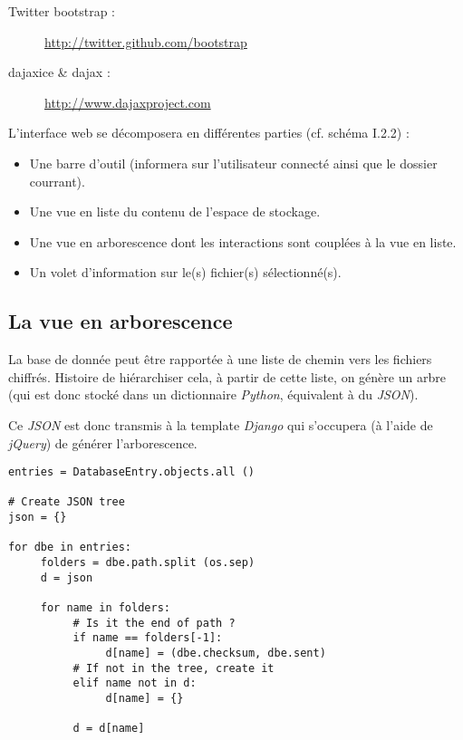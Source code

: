 \begin{description}
     \item[Twitter bootstrap :] \url{http://twitter.github.com/bootstrap}
     \item[dajaxice \& dajax :] \url{http://www.dajaxproject.com}
\end{description}


L'interface web se décomposera en différentes parties (cf. schéma I.2.2) :

\begin{itemize}
     \item Une barre d'outil (informera sur l'utilisateur connecté ainsi que le dossier courrant).
     \item Une vue en liste du contenu de l'espace de stockage.
     \item Une vue en arborescence dont les interactions sont couplées à la vue en liste.
     \item Un volet d'information sur le(s) fichier(s) sélectionné(s).
\end{itemize}

\subsection{La vue en arborescence}

La base de donnée peut être rapportée à une liste de chemin vers les fichiers chiffrés. Histoire
de hiérarchiser cela, à partir de cette liste, on génère un arbre (qui est donc stocké dans un
dictionnaire \textit{Python}, équivalent à du \textit{JSON}).

Ce \textit{JSON} est donc transmis à la template \textit{Django} qui s'occupera (à l'aide de \textit{jQuery})
de générer l'arborescence.

\begin{verbatim}
entries = DatabaseEntry.objects.all ()

# Create JSON tree
json = {}

for dbe in entries:
     folders = dbe.path.split (os.sep)
     d = json

     for name in folders:
          # Is it the end of path ?
          if name == folders[-1]:
               d[name] = (dbe.checksum, dbe.sent)
          # If not in the tree, create it
          elif name not in d:
               d[name] = {}

          d = d[name]
\end{verbatim}
